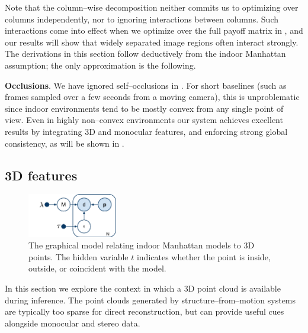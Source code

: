 Note that the column--wise decomposition 
neither commits us to optimizing over columns independently, nor to
ignoring interactions between columns. Such interactions come into
effect when we optimize over the full payoff matrix
in , and our results will show that widely
separated image regions often interact strongly. The derivations
in this section follow deductively from the indoor Manhattan
assumption; the only approximation is the following.

\textbf{Occlusions}. We have ignored self--occlusions in
. For short baselines (such as frames
sampled over a few seconds from a moving camera), this is
unproblematic since indoor environments tend to be mostly convex from
any single point of view. Even in highly non--convex environments our
system achieves excellent results by integrating 3D and monocular
features, and enforcing strong global consistency, as will be shown in
.



\subsection{3D features}
\begin{figure}[tb]
  \centering
  \includegraphics[width=0.35\textwidth]{figures/3d-gm}
  \caption{The graphical model relating indoor Manhattan models to 3D
    points. The hidden variable $t$ indicates whether the point is
    inside, outside, or coincident with the model.}
  \label{fig:3d-gm}
\end{figure}

In this section we explore the context in which a 3D point cloud is
available during inference. The point clouds generated by
structure--from--motion systems are typically too sparse for direct
reconstruction, but can provide useful cues alongside monocular and
stereo data.


